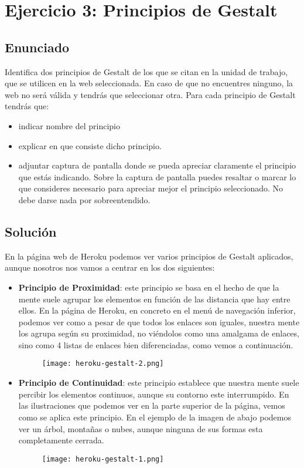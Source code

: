\section{Ejercicio 3: Principios de Gestalt}

\subsection{Enunciado}
Identifica dos principios de Gestalt de los que se citan en la unidad de trabajo, que se utilicen en la web seleccionada. En caso de que no encuentres ninguno, la web no será válida y tendrás que seleccionar otra. Para cada principio de Gestalt tendrás que:

\begin{itemize}
    \item indicar nombre del principio
    \item explicar en que consiste dicho principio.
    \item adjuntar captura de pantalla donde se pueda apreciar claramente el principio que estás indicando. Sobre la captura de pantalla puedes resaltar o marcar lo que consideres necesario para apreciar mejor el principio seleccionado. No debe darse nada por sobreentendido.
\end{itemize}

\subsection{Solución}
En la página web de Heroku podemos ver varios principios de Gestalt aplicados, aunque nosotros nos vamos a centrar en los dos siguientes:

\begin{itemize}
    \item \textbf{Principio de Proximidad}: este principio se basa en el hecho de que la mente suele agrupar los elementos en función de las distancia que hay entre ellos. En la página de Heroku, en concreto en el menú de navegación inferior, podemos ver como a pesar de que todos los enlaces son iguales, nuestra mente los agrupa según su proximidad, no viéndolos como una amalgama de enlaces, sino como 4 listas de enlaces bien diferenciadas, como vemos a continuación.

    \begin{figure}[H]
        \centering
        \texttt{[image: heroku-gestalt-2.png]}
    \end{figure}

    \item \textbf{Principio de Continuidad}: este principio establece que nuestra mente suele percibir los elementos continuos, aunque su contorno este interrumpido. En las ilustraciones que podemos ver en la parte superior de la página, vemos como se aplica este principio. En el ejemplo de la imagen de abajo podemos ver un árbol, montañas o nubes, aunque ninguna de sus formas esta completamente cerrada.

    \begin{figure}[H]
        \centering
        \texttt{[image: heroku-gestalt-1.png]}
    \end{figure}
\end{itemize}

